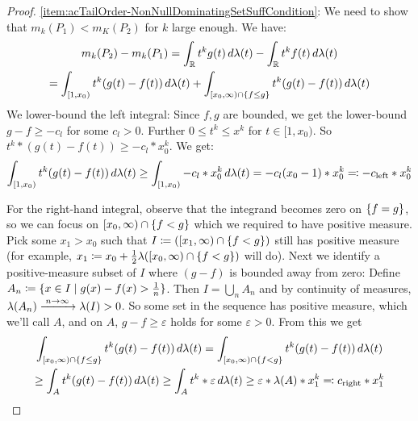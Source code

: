 \documentclass[a4paper]{scrreprt}
\let\epsilon\varepsilon
\begin{document}
    \begin{proof}
        \ref{item:acTailOrder-NonNullDominatingSetSuffCondition}:
        We need to show that $m_k(P_1) < m_K(P_2)$ for $k$ large enough. We have:
        \begin{multline*}
            m_k(P_2) - m_k(P_1)
            = \int_{\mathbb{R}} t^k g(t) \, d\lambda(t) - \int_{\mathbb{R}} t^k f(t) \, d\lambda(t) \\
            = \int_{[1, x_0)} t^k(g(t) - f(t)) \, d\lambda(t) 
              + \int_{[x_0, \infty)\cap \{f \leq g\}} t^k(g(t) - f(t)) \, d\lambda(t)
        \end{multline*}
        We lower-bound the left integral:
        Since $f, g$ are bounded, we get the lower-bound $g-f \geq - c_l$ for some $c_l > 0$.
        Further $0 \leq t^k \leq x^k$ for $t \in [1, x_0)$. So $t^k*(g(t) - f(t)) \geq -c_l*x_0^k$.
        We get:
        \begin{multline*}
            \int_{[1, x_0)} t^k(g(t) - f(t)) \, d\lambda(t)
            \geq \int_{[1, x_0)} -c_l*x_0^k \, d\lambda(t)
            = -c_l (x_0 - 1)*x_0^k 
            \eqqcolon -c_{\text{left}} * x_0^k
        \end{multline*}
        
        For the right-hand integral, observe that the integrand becomes zero on $\{f = g\}$, so we can focus on $[x_0, \infty) \cap \{f < g\}$ which we required to have positive measure.
        Pick some $x_1 > x_0$ such that $I \coloneqq ([x_1, \infty) \cap \{f < g\})$ still has positive measure (for example, $x_1 \coloneqq x_0 + \frac{1}{2} \lambda([x_0, \infty) \cap \{f < g\})$ will do).
        Next we identify a positive-measure subset of $I$ where $(g-f)$ is bounded away from zero:
        Define $A_n \coloneqq \{x \in I \mid g(x) - f(x) > \frac{1}{n}\}$.
        Then $I = \bigcup_n A_n$ and by continuity of measures, $\lambda(A_n) \xrightarrow{\;n \to \infty\;} \lambda(I) > 0$. So some set in the sequence has positive measure, which we'll call $A$, and on $A$, $g-f \geq \epsilon$ holds for some $\epsilon > 0$. From this we get 
        \begin{multline*}
            \lintegral{[x_0, \infty)\cap \set{f \leq g}}{t^k(g(t) - f(t))}{\lambda(t)}
            = \lintegral{[x_0, \infty)\cap \set{f < g}}{t^k(g(t) - f(t))}{\lambda(t)} \\
            \geq \lintegral{A}{t^k(g(t) - f(t))}{\lambda(t)}
            \geq \lintegral{A}{t^k*\epsilon}{\lambda(t)}
            \geq \epsilon*\lambda(A)*x_1^k
            \eqqcolon c_{\text{right}}*x_1^k
        \end{multline*}
        

\end{proof}
\end{document}
